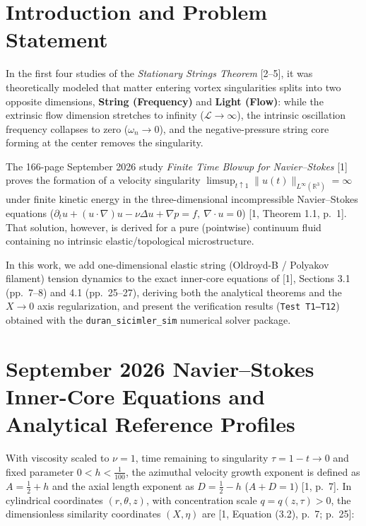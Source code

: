 \documentclass[12pt,a4paper]{article}
\begin{document}
\section{Introduction and Problem Statement}

In the first four studies of the \textit{Stationary Strings Theorem} [2--5], it was theoretically modeled that matter entering vortex singularities splits into two opposite dimensions, \textbf{String (Frequency)} and \textbf{Light (Flow)}: while the extrinsic flow dimension stretches to infinity ($\mathcal{L} \to \infty$), the intrinsic oscillation frequency collapses to zero ($\omega_n \to 0$), and the negative-pressure string core forming at the center removes the singularity.

The 166-page September 2026 study \textit{Finite Time Blowup for Navier--Stokes} [1] proves the formation of a velocity singularity $\limsup_{t \uparrow 1} \|u(t)\|_{L^\infty(\mathbb{R}^3)} = \infty$ under finite kinetic energy in the three-dimensional incompressible Navier--Stokes equations ($\partial_t u + (u \cdot \nabla)u - \nu \Delta u + \nabla p = f, \ \nabla \cdot u = 0$) [1, Theorem 1.1, p.\ 1]. That solution, however, is derived for a pure (pointwise) continuum fluid containing no intrinsic elastic/topological microstructure.

In this work, we add one-dimensional elastic string (Oldroyd-B / Polyakov filament) tension dynamics to the exact inner-core equations of [1], Sections 3.1 (pp.\ 7--8) and 4.1 (pp.\ 25--27), deriving both the analytical theorems and the $X \to 0$ axis regularization, and present the verification results (\texttt{Test T1--T12}) obtained with the \texttt{duran\_sicimler\_sim} numerical solver package.

\section{September 2026 Navier--Stokes Inner-Core Equations and Analytical Reference Profiles}

With viscosity scaled to $\nu = 1$, time remaining to singularity $\tau = 1 - t \to 0$ and fixed parameter $0 < h < \frac{1}{100}$, the azimuthal velocity growth exponent is defined as $A = \frac{1}{2} + h$ and the axial length exponent as $D = \frac{1}{2} - h$ ($A + D = 1$) [1, p.\ 7]. In cylindrical coordinates $(r, \theta, z)$, with concentration scale $q = q(z, \tau) > 0$, the dimensionless similarity coordinates $(X, \eta)$ are [1, Equation (3.2), p.\ 7; p.\ 25]:
\end{document}
